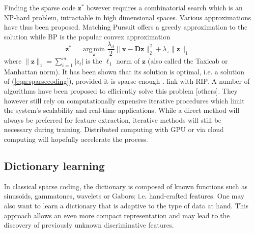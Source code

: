 \documentclass[a4paper,12pt,twoside]{report}
\newcommand{\eqnref}[1]{(\ref{#1})}  %
\DeclareMathOperator*{\argminop}{arg\,min}
\newcommand{\argmin}[1]{\argminop\limits_{#1}}
\newcommand{\normT}[1]{\| #1 \|_2^2}
\newcommand{\normO}[1]{\| #1 \|_1}
\newcommand{\D}{\mathbf{D}}
\newcommand{\x}{\mathbf{x}}
\newcommand{\z}{\mathbf{z}}
\begin{document}
Finding the sparse code $\z^*$ however requires a combinatorial search which is an NP-hard problem, intractable in high dimensional spaces. Various approximations have thus been proposed. Matching Pursuit \cite{mallat1993MatchingPursuit} offers a greedy approximation to the solution while \gls{BP} \cite{chen1998BasisPursuit} is the popular convex approximation
\begin{equation}\label{eqn:basispursuit}
	\z^* = \argmin{\z} \frac{\lambda_d}{2} \normT{\x - \D \z} + \lambda_z \normO{\z}
\end{equation}
where $\normO{\z} = \sum_{i=1}^{m} |z_i|$ is the $\ell_1$ norm of $\z$ (also called the Taxicab or Manhattan norm). It has been shown that its solution is optimal, i.e. a solution of \eqnref{eqn:sparsecoding}, provided it is sparse enough \cite{donoho2003OptSparse}. {\color{red}link with \gls{RIP}}. A number of algorithms have been proposed to efficiently solve this problem \cite{chen1998BasisPursuit, beck2009FISTA, ng2006EfficientSparse, li2009Coordinate} {\color{red} [others]}. They however still rely on computationally expensive iterative procedures which limit the system's scalability and real-time applications. While a direct method will always be preferred for feature extraction, iterative methods will still be necessary during training. Distributed computing with \gls{GPU} or via cloud computing will hopefully accelerate the process.

\subsection{Dictionary learning}

In classical sparse coding, the dictionary is composed of known functions such as sinusoids, gammatones, wavelets or Gabors; i.e. hand-crafted features. One may also want to learn a dictionary that is adaptive to the type of data at hand. This approach allows an even more compact representation and may lead to the discovery of previously unknown discriminative features.
\end{document}
